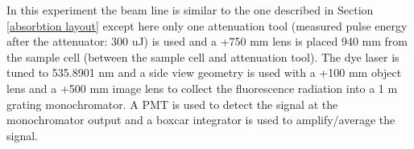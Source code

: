 \label{sample layout}
In this experiment the beam line is similar to the one described in Section \ref{absorbtion layout} except here only one attenuation tool (measured pulse energy after the attenuator: 300 uJ) is used and a +750 mm lens is placed 940 mm from the sample cell (between the sample cell and attenuation tool). The dye laser is tuned to 535.8901 nm and a side view geometry is used with a +100 mm object lens and a +500 mm image lens to collect the fluorescence radiation into a 1 m grating monochromator. A PMT is used to detect the signal at the monochromator output and a boxcar integrator is used to amplify/average the signal.
